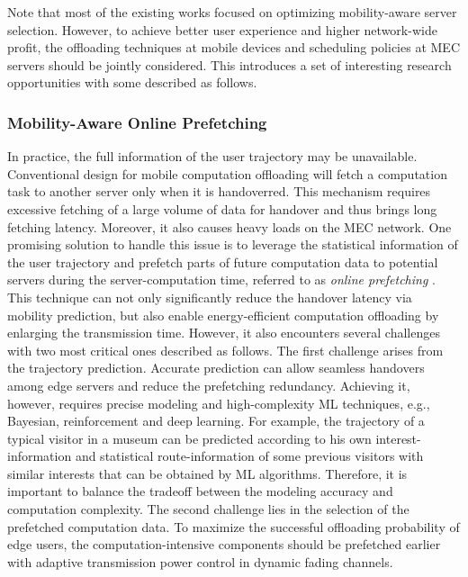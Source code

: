 \documentclass[journal]{IEEEtran}
\begin{document}
{Note that most of the existing works focused on optimizing mobility-aware server selection. However, to achieve better user experience and higher network-wide profit, the offloading techniques at mobile devices and scheduling policies at MEC servers should be jointly considered. This introduces a set of interesting research opportunities with some described as follows.

\subsubsection{\textbf{Mobility-Aware Online Prefetching}} In practice, the full information of the user trajectory may be unavailable. Conventional design for mobile computation offloading will fetch a computation task to another server only when it is handoverred. This mechanism requires excessive fetching of a large volume of data for handover and thus brings long fetching latency. Moreover, it also causes heavy loads on the MEC network. One promising solution to handle this issue is to leverage the statistical information of the user trajectory and prefetch parts of future computation data to potential servers during the server-computation time, referred to as \emph{online prefetching} \cite{ko2016online}. This technique can not only significantly reduce the handover latency via mobility prediction, but also enable energy-efficient computation offloading by enlarging the transmission time. However, it also encounters several challenges with two most critical ones described as follows. The first challenge arises from the trajectory prediction. Accurate prediction can allow seamless handovers among edge servers and reduce the prefetching redundancy. Achieving it, however, requires precise modeling and high-complexity ML techniques, e.g., Bayesian, reinforcement and deep learning. For example, the trajectory of a typical visitor in a museum can be predicted according to his own interest-information and statistical route-information of some previous visitors with similar interests that can be obtained by ML algorithms. Therefore, it is important to balance the tradeoff between the modeling accuracy and computation complexity. The second challenge lies in the selection of the prefetched computation data. To maximize the successful offloading probability of edge users, the computation-intensive components should be prefetched earlier with adaptive transmission power control in dynamic fading channels.


}
\end{document}
